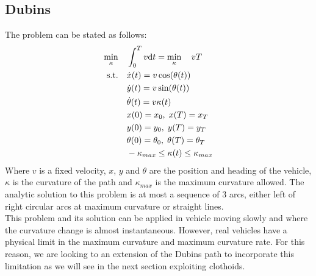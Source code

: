 \documentclass[11pt,twocolumn]{scrartcl}
\begin{document}
\subsection*{Dubins}
The problem can be stated as follows:
%
\begin{equation}
  \begin{split}
    \min_{\kappa}  \quad & \int_0^T v \differential t = \min_{\kappa}  \quad v T \\ %
    \text{s.t.} \quad 
      &\dot{x}(t)      = v \cos(\theta(t)) \\
      &\dot{y}(t)      = v \sin(\theta(t)) \\
      &\dot{\theta}(t) = v \kappa(t)       \\
      &x(0)      = x_0,      \; x(T)      = x_T\\
      &y(0)      = y_0,      \; y(T)      = y_T\\
      &\theta(0) = \theta_0, \; \theta(T) = \theta_T\\
      &-\kappa_{max} \le \kappa(t) \le \kappa_{max}   
  \end{split}
\end{equation}
%
Where $v$ is a fixed velocity, $x$, $y$ and $\theta$ are the position and heading of the vehicle, $\kappa$ is the curvature of the path and $\kappa_{max}$ is the maximum curvature allowed. 
The analytic solution to this problem is at most a sequence of 3 arcs, either left of right circular arcs at maximum curvature or straight lines.\cite{shkel2001classification}\\
%
This problem and its solution can be applied in vehicle moving slowly and where the curvature change is almost instantaneous. However, real vehicles have a physical limit in the maximum curvature and maximum curvature rate. For this reason, we are looking to an extension of the Dubins path to incorporate this limitation as we will see in the next section exploiting clothoids.\cite{bertolazzi2015g1,bertolazzi2018clothoids}
%
\end{document}
